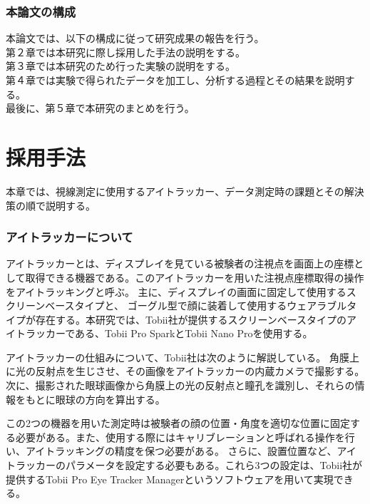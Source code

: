 \documentclass[paper=a4paper,fontsize=11pt]{jlreq}
\begin{document}
  \section{本論文の構成}
    本論文では、以下の構成に従って研究成果の報告を行う。\\
    第２章では本研究に際し採用した手法の説明をする。\\
    第３章では本研究のため行った実験の説明をする。\\
    第４章では実験で得られたデータを加工し、分析する過程とその結果を説明する。\\
    最後に、第５章で本研究のまとめを行う。

\clearpage

\part{採用手法}
  本章では、視線測定に使用するアイトラッカー、データ測定時の課題とその解決策の順で説明する。

  \section{アイトラッカーについて}
    アイトラッカーとは、ディスプレイを見ている被験者の注視点を画面上の座標として取得できる機器である。このアイトラッカーを用いた注視点座標取得の操作をアイトラッキングと呼ぶ。
    主に、ディスプレイの画面に固定して使用するスクリーンベースタイプと、
    ゴーグル型で顔に装着して使用するウェアラブルタイプが存在する。本研究では、Tobii社が提供するスクリーンベースタイプのアイトラッカーである、Tobii Pro Spark\cite{spark}とTobii Nano Pro\cite{nano}を使用する。

    アイトラッカーの仕組みについて、Tobii社は次のように解説している\cite{itracking_sikumi}。
    角膜上に光の反射点を生じさせ、その画像をアイトラッカーの内蔵カメラで撮影する。次に、撮影された眼球画像から角膜上の光の反射点と瞳孔を識別し、それらの情報をもとに眼球の方向を算出する。
    
    この2つの機器を用いた測定時は被験者の顔の位置・角度を適切な位置に固定する必要がある。また、使用する際にはキャリブレーションと呼ばれる操作を行い、アイトラッキングの精度を保つ必要がある。
    さらに、設置位置など、アイトラッカーのパラメータを設定する必要もある。これら3つの設定は、Tobii社が提供するTobii Pro Eye Tracker Manager\cite{manager}というソフトウェアを用いて実現できる。
\end{document}

